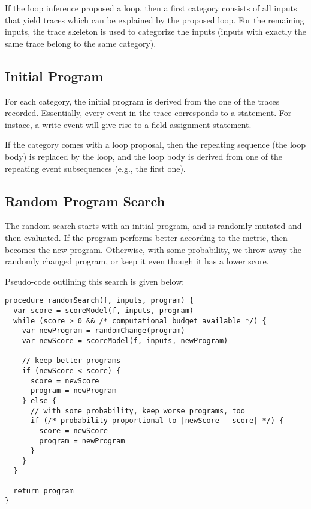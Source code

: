 \documentclass[]{article}
\begin{document}
If the loop inference proposed a loop, then a first category consists of
all inputs that yield traces which can be explained by the proposed loop.
For the remaining inputs, the trace skeleton is used to categorize
the inputs (inputs with exactly the same trace belong to the same
category).

\subsection{Initial Program}

For each category, the initial program is derived from the one of the traces
recorded.
Essentially, every event in the trace corresponds to a statement.  For instace,
a write event will give rise to a field assignment statement.

If the category comes with a loop proposal, then the repeating sequence
(the loop body) is replaced by the loop, and the loop body is derived from
one of the repeating event subsequences (e.g., the first one).


\subsection{Random Program Search}

The random search starts with an initial program, and is randomly mutated
and then evaluated.  If the program performs better according to the
metric, then becomes the new program.  Otherwise, with some probability,
we throw away the randomly changed program, or keep it even though it
has a lower score.

Pseudo-code outlining this search is given below:

\begin{verbatim}
procedure randomSearch(f, inputs, program) {
  var score = scoreModel(f, inputs, program)
  while (score > 0 && /* computational budget available */) {
    var newProgram = randomChange(program)
    var newScore = scoreModel(f, inputs, newProgram)
    
    // keep better programs
    if (newScore < score) {
      score = newScore
      program = newProgram
    } else {
      // with some probability, keep worse programs, too
      if (/* probability proportional to |newScore - score| */) {
        score = newScore
        program = newProgram
      }
    }
  }
  
  return program
}
\end{verbatim}
\end{document}
